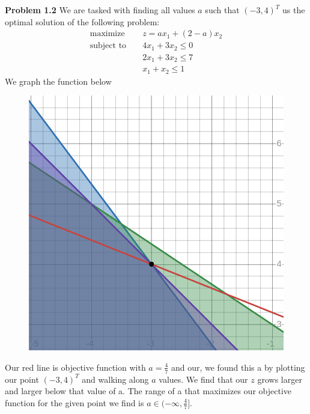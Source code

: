 \documentclass{article}
\begin{document}
\textbf{Problem 1.2} We are tasked with finding all values $a$ such that $(-3,4)^T$ us the optimal solution of the following problem:
\begin{align*}
  \text{maximize } && z = ax_1 + (2-a)x_2 \\
  \text{subject to } && 4x_1 + 3x_2 \leq 0 \\
  && 2x_1 + 3x_2 \leq 7 \\ 
  && x_1 + x_2 \leq 1
\end{align*}
We graph the function below
\begin{figure}[H]
    \centering
    \includegraphics[scale = 0.35]{1.2.png}
\end{figure}
Our red line is objective function with $a = \frac{4}{7}$ and our, we found this a by plotting our point $(-3,4)^T$ and walking along $a$ values. We find that our $z$ grows larger and larger below that value of a. The range of a that maximizes our objective function for the given point we find is $a \in (-\infty, \frac{4}{7}] $. 
\end{document}
